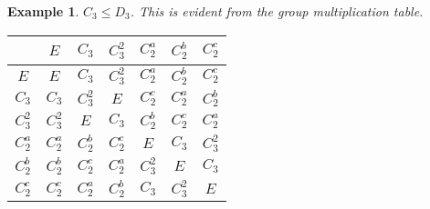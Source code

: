 \documentclass{article}
\theoremstyle{plain}\theoremheaderfont{\normalfont\itshape}\theorembodyfont{\rmfamily}\theoremseparator{.}\newtheorem*{rem}{Remark}\newtheorem*{ex}{Example}\newtheorem*{proof}{Proof}\newtheorem*{altp}{Alternative proof}
\theoremstyle{plain}\theoremheaderfont{\normalfont\bfseries}\theorembodyfont{\rmfamily}\theoremseparator{.}\newtheorem{thm}{Theorem}[section]\newtheorem{lem}[thm]{Lemma}\newtheorem{prop}[thm]{Proposition}\newtheorem*{cor}{Corollary}\newtheorem{defn}[thm]{Definition}\newtheorem{clm}[thm]{Claim}\newtheorem{clminproof}{Claim}\newtheorem*{law}{Law}\newtheorem{pos}[thm]{Postulate}
\theoremstyle{break}\theoremheaderfont{\normalfont\itshape}\theorembodyfont{\rmfamily}\theoremseparator{.\medskip}\newtheorem*{proofskip}{Proof}\newtheorem*{exs}{Examples}\newtheorem*{rems}{Remarks}
\theoremstyle{break}\theoremheaderfont{\normalfont\bfseries}\theorembodyfont{\rmfamily}\theoremseparator{.\medskip}\newtheorem{lemskip}[thm]{Lemma}\newtheorem{defnskip}[thm]{Definition}\newtheorem{propskip}[thm]{Proposition}\newtheorem{thmskip}[thm]{Theorem}
\numberwithin{equation}{section}
\begin{document}
    \begin{ex}
        \(C_3\le D_3\). This is evident from the group multiplication table.
        \begin{table}[ht!]
            \centering\renewcommand{\arraystretch}{1.3}
            \begin{tabular}{c|cccccc}
                ~ & \(E\) & \(C_3\) & \(C_3^2\) & \(C_2^a\) & \(C_2^b\) & \(C_2^c\) \\ \hline
                \(E\) & \(E\) & \(C_3\) & \(C_3^2\) & \(C_2^a\) & \(C_2^b\) & \(C_2^c\) \\
                \(C_3\) & \(C_3\) & \(C_3^2\) & \(E\) & \(C_2^c\) & \(C_2^a\) & \(C_2^b\) \\
                \(C_3^2\) & \(C_3^2\) & \(E\) & \(C_3\) & \(C_2^b\) & \(C_2^c\) & \(C_2^a\) \\
                \(C_2^a\) & \(C_2^a\) & \(C_2^b\) & \(C_2^c\) & \(E\) & \(C_3\) & \(C_3^2\) \\
                \(C_2^b\) & \(C_2^b\) & \(C_2^c\) & \(C_2^a\) & \(C_3^2\) & \(E\) & \(C_3\) \\
                \(C_2^c\) & \(C_2^c\) & \(C_2^a\) & \(C_2^b\) & \(C_3\) & \(C_3^2\) & \(E\)
            \end{tabular}
        \end{table}
    \end{ex}
\end{document}
